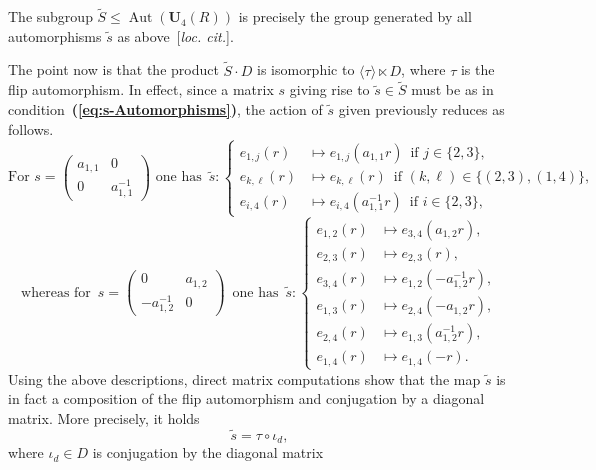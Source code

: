 \documentclass[a4paper,11pt]{amsart}
\numberwithin{equation}{section}
\theoremstyle{plain}
\theoremstyle{definition}
\newcommand{\mbU}{\mathbf{U}} %
\newcommand{\gera}[1]{\langle {#1} \rangle}
\newcommand{\bref}[1]{{\bf(\ref{#1})}} %
\DeclareMathOperator{\Aut}{Aut}
\begin{document}
The subgroup $\widetilde{S} \leq \Aut(\mbU_4(R))$ is precisely the group generated by all automorphisms $\widetilde{s}$ as above~[\emph{loc. cit.}]. 

The point now is that the product $\widetilde{S} \cdot D$ is isomorphic to $\gera{\tau} \ltimes D$, where $\tau$ is the flip automorphism. In effect, since a matrix $s$ giving rise to $\widetilde{s} \in \widetilde{S}$ must be as in condition~\bref{eq:s-Automorphisms}, the action of $\widetilde{s}$ given previously reduces as follows.
\[
\text{For } s=\left( \begin{smallmatrix} a_{1,1} & 0 \\ 0 & a_{1,1}^{-1} \end{smallmatrix} \right) \text{ one has } \, \widetilde{s}: \begin{cases} e_{1,j}(r) & \mapsto e_{1,j}(a_{1,1}r) \, \text{ if } j \in \{ 2,3 \}, \\ 
e_{k,\ell}(r) & \mapsto e_{k,\ell}(r) \, \text{ if } (k,\ell) \in \{ (2,3), (1,4)\}, \\ 
e_{i,4}(r) & \mapsto e_{i,4}(a_{1,1}^{-1}r) \, \text{ if } i \in \{ 2,3 \},
\end{cases}
\]
\[
\text{whereas for } \, s=\left( \begin{smallmatrix} 0 & a_{1,2} \\ -a_{1,2}^{-1} & 0 \end{smallmatrix} \right) \, \text{ one has } \, \widetilde{s} : 
\begin{cases} e_{1,2}(r) & \mapsto e_{3,4}(a_{1,2}r), \\ 
e_{2,3}(r) & \mapsto e_{2,3}(r), \\ 
e_{3,4}(r) & \mapsto e_{1,2}(-a_{1,2}^{-1}r), \\
e_{1,3}(r) & \mapsto e_{2,4}(-a_{1,2}r), \\
e_{2,4}(r) & \mapsto e_{1,3}(a_{1,2}^{-1}r), \\
e_{1,4}(r) & \mapsto e_{1,4}(-r).
\end{cases}
\]
Using the above descriptions, direct matrix computations show that the map $\widetilde{s}$ is in fact a composition of the flip automorphism and conjugation by a diagonal matrix. More precisely, it holds 
\[\widetilde{s} = \tau \circ \iota_d,\]
where $\iota_d \in D$ is conjugation by the diagonal matrix 
\end{document}
